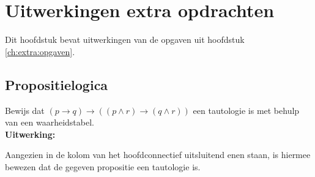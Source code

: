 %



\chapter{Uitwerkingen extra opdrachten}
Dit hoofdstuk bevat uitwerkingen van de opgaven uit hoofdstuk \ref{ch:extra:opgaven}.

\renewcommand{\theanswerT}{Ex.\arabic{section}.\arabic{answerT}}

\section{Propositielogica}
\setcounter{answerT}{0}
\begin{answer}
Bewijs dat $(p\rightarrow q)\rightarrow ((p\land r)\rightarrow (q\land r))$ een tautologie is met behulp van een waarheidstabel.\\[2.5pt]

\noindent\textbf{Uitwerking:}
\begin{center}
\end{center}
Aangezien in de kolom van het hoofdconnectief uitsluitend enen staan, is hiermee bewezen dat de gegeven propositie een tautologie is.
\end{answer}

